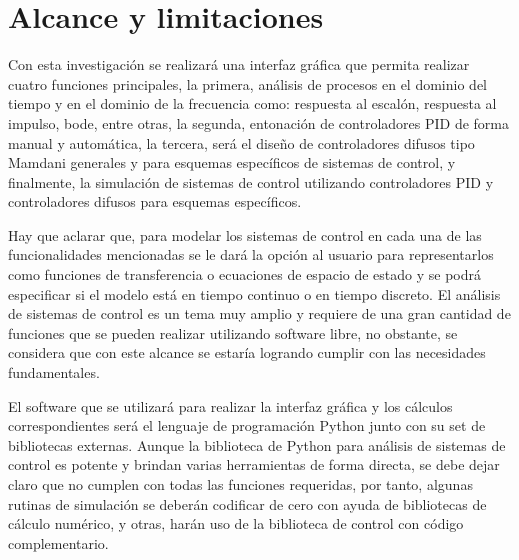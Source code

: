 \section{Alcance y limitaciones}

	Con esta investigación se realizará una interfaz gráfica que permita realizar cuatro funciones principales, la primera, análisis de procesos en el dominio del tiempo y en el dominio de la frecuencia como: respuesta al escalón, respuesta al impulso, bode, entre otras, la segunda, entonación de controladores PID de forma manual y automática, la tercera, será el diseño de controladores difusos tipo Mamdani generales y para esquemas específicos de sistemas de control, y finalmente, la simulación de sistemas de control utilizando controladores PID y controladores difusos para esquemas específicos.

	Hay que aclarar que, para modelar los sistemas de control en cada una de las funcionalidades mencionadas se le dará la opción al usuario para representarlos como funciones de transferencia o ecuaciones de espacio de estado y se podrá especificar si el modelo está en tiempo continuo o en tiempo discreto. El análisis de sistemas de control es un tema muy amplio y requiere de una gran cantidad de funciones que se pueden realizar utilizando software libre, no obstante, se considera que con este alcance se estaría logrando cumplir con las necesidades fundamentales. 

	El software que se utilizará para realizar la interfaz gráfica y los cálculos correspondientes será el lenguaje de programación Python junto con su set de bibliotecas externas. Aunque la biblioteca de Python para análisis de sistemas de control es potente y brindan varias herramientas de forma directa, se debe dejar claro que no cumplen con todas las funciones requeridas, por tanto, algunas rutinas de simulación se deberán codificar de cero con ayuda de bibliotecas de cálculo numérico, y otras, harán uso de la biblioteca de control con código complementario.
